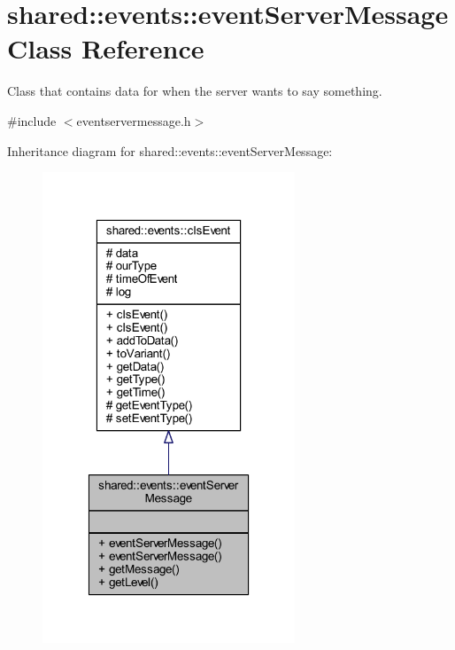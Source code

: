 \hypertarget{classshared_1_1events_1_1event_server_message}{\section{shared\-:\-:events\-:\-:event\-Server\-Message Class Reference}
\label{d6/dfe/classshared_1_1events_1_1event_server_message}
}


Class that contains data for when the server wants to say something.  




{\ttfamily \#include $<$eventservermessage.\-h$>$}



Inheritance diagram for shared\-:\-:events\-:\-:event\-Server\-Message\-:\nopagebreak
\begin{figure}[H]
\begin{center}
\leavevmode
\includegraphics[width=214pt]{d8/d2b/classshared_1_1events_1_1event_server_message__inherit__graph}
\end{center}
\end{figure}


